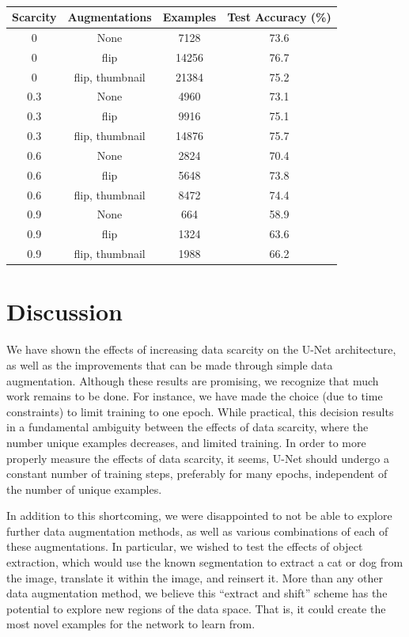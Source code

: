 \documentclass[10pt, journal]{IEEEtran}
\begin{document}
\begin{table}
  \centering
  \begin{tabular}{|c|c|c|c|}
    \hline
    Scarcity & Augmentations & Examples & Test Accuracy (\%) \\
    \hline
    0 & None & 7128 & 73.6 \\
    \hline
    0 & flip & 14256 & 76.7 \\
    \hline
    0 & flip, thumbnail & 21384 & 75.2 \\
    \hline
    0.3 & None & 4960 & 73.1 \\
    \hline
    0.3 & flip & 9916 & 75.1 \\
    \hline
    0.3 & flip, thumbnail & 14876 & 75.7 \\
    \hline
    0.6 & None & 2824 & 70.4 \\
    \hline
    0.6 & flip & 5648 & 73.8 \\
    \hline
    0.6 & flip, thumbnail & 8472 & 74.4 \\
    \hline
    0.9 & None & 664 & 58.9 \\
    \hline
    0.9 & flip & 1324 & 63.6 \\
    \hline
    0.9 & flip, thumbnail & 1988 & 66.2 \\
    \hline
  \end{tabular}
  \vspace{0.7em}
  \caption{}
  \label{tab:dataset-summary}
\end{table}

\section{Discussion}
\label{sec:discussion}

We have shown the effects of increasing data scarcity on the U-Net architecture,
as well as the improvements that can be made through simple data
augmentation. Although these results are promising, we recognize that much work
remains to be done. For instance, we have made the choice (due to time
constraints) to limit training to one epoch. While practical, this decision
results in a fundamental ambiguity between the effects of data scarcity, where
the number unique examples decreases, and limited training.  In order to more
properly measure the effects of data scarcity, it seems, U-Net should undergo a
constant number of training steps, preferably for many epochs, independent of
the number of unique examples.

In addition to this shortcoming, we were disappointed to not be able to explore
further data augmentation methods, as well as various combinations of each of
these augmentations. In particular, we wished to test the effects of object
extraction, which would use the known segmentation to extract a cat or dog from
the image, translate it within the image, and reinsert it. More than any other
data augmentation method, we believe this ``extract and shift'' scheme has the
potential to explore new regions of the data space. That is, it could create the
most novel examples for the network to learn from.
\end{document}
